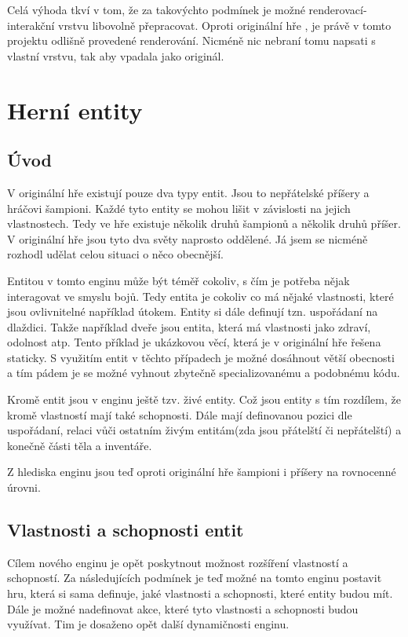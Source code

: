 Celá výhoda tkví v tom, že za takovýchto podmínek je možné renderovací-interakční vrstvu libovolně přepracovat. Oproti originální hře
, je právě v tomto projektu odlišně provedené renderování. Nicméně nic nebraní tomu napsati s vlastní vrstvu, tak aby vpadala jako originál.

\section{Herní entity}
\subsection{Úvod}
V originální hře existují pouze dva typy entit. Jsou to nepřátelské příšery a hráčovi šampioni. Každé tyto entity se mohou lišit 
v závislosti na jejich vlastnostech. Tedy ve hře existuje několik druhů šampionů a několik druhů příšer. V originální hře jsou 
tyto dva světy naprosto oddělené. Já jsem se nicméně rozhodl udělat celou situaci o něco obecnější.

Entitou v tomto enginu může být téměř cokoliv, s čím je potřeba nějak interagovat ve smyslu bojů. Tedy entita je cokoliv co má nějaké vlastnosti,
které jsou ovlivnitelné například útokem.
Entity si dále definují tzn. uspořádaní na dlaždici. Takže například dveře jsou entita, která má vlastnosti jako zdraví, odolnost atp.
Tento příklad je ukázkovou věcí, která je v originální hře řešena staticky. S využitím entit v těchto případech je možné dosáhnout  větší obecnosti
a tím pádem je se možné vyhnout zbytečně specializovanému a podobnému kódu.

Kromě entit jsou v enginu ještě tzv. živé entity. Což jsou entity s tím rozdílem, že kromě vlastností mají také schopnosti.
Dále mají definovanou pozici dle uspořádaní, relaci vůči ostatním živým entitám(zda jsou přátelští či nepřátelští) a 
konečně části těla a inventáře.

Z hlediska enginu jsou teď oproti originální hře šampioni i příšery na rovnocenné úrovni.

\subsection{Vlastnosti a schopnosti entit}
Cílem nového enginu je opět poskytnout možnost rozšíření vlastností a schopností.
Za následujících podmínek je teď možné na tomto enginu postavit hru, která si sama definuje, jaké vlastnosti a schopnosti, které entity budou mít.
Dále je možné nadefinovat akce, které tyto vlastnosti a schopnosti budou využívat. Tim je dosaženo opět další dynamičnosti enginu.

